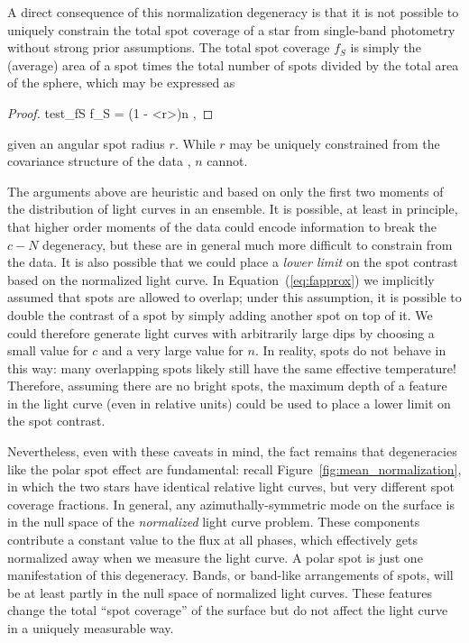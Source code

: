 \documentclass[modern]{aastex62}
\begin{document}
A direct consequence of this normalization degeneracy is that it is not
possible to uniquely constrain the total spot coverage of a star from
single-band photometry without strong prior assumptions.
The total spot coverage $f_S$
is simply the (average) area of a spot
times the total number of spots divided by the total area of the sphere, which
may be expressed as
%
\begin{proof}{test_fS}
    \label{eq:fS}
    f_S = \left(1 - \left<\cos r\right>\right)n
    \quad,
\end{proof}
%
given an angular spot radius $r$.
While $r$ may be uniquely constrained from the covariance structure of the data
, $n$ cannot.

The arguments above are heuristic and based on only the first two moments
of the distribution of light curves in an ensemble.
It is possible, at least in principle, that higher order moments of the data
could encode information to
break the $c-N$ degeneracy, but these are in general much more difficult
to constrain from the data. It is also possible that we could place a
\emph{lower limit} on the spot contrast based on the normalized light
curve. In Equation~(\ref{eq:fapprox}) we implicitly assumed that
spots are allowed to overlap; under this assumption, it is possible to
double the contrast of a spot by simply adding another spot on top
of it. We could therefore generate light curves with arbitrarily
large dips by choosing a small value for $c$ and a very large value for $n$.
In reality, spots do not behave in this way: many overlapping spots
likely still have the same effective temperature! Therefore,
assuming there are no bright spots,
the maximum depth of a feature in the light curve (even in relative units)
could be used to place a lower limit on the spot contrast.

Nevertheless, even with these caveats in mind, the fact remains
that degeneracies like the polar spot effect are fundamental: recall
Figure~\ref{fig:mean_normalization}, in which the two stars
have identical relative light curves, but very different spot coverage
fractions. In general, any azimuthally-symmetric mode on the surface
is in the null space of the \emph{normalized} light curve problem. These
components contribute a constant value to the flux at all phases, which
effectively gets normalized away when we measure the light curve. A
polar spot is just one manifestation of this degeneracy. Bands, or
band-like arrangements of spots, will be at least partly in the null
space of normalized light curves. These features change the total ``spot coverage''
of the surface but do not affect the light curve in a uniquely measurable
way.
\end{document}
